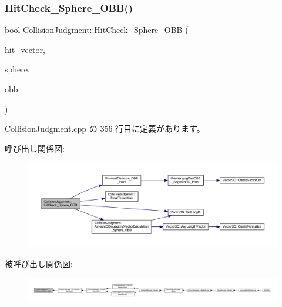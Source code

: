 \subsubsection{\texorpdfstring{Hit\+Check\+\_\+\+Sphere\+\_\+\+O\+B\+B()}{HitCheck\_Sphere\_OBB()}}
{\footnotesize\ttfamily bool Collision\+Judgment\+::\+Hit\+Check\+\_\+\+Sphere\+\_\+\+O\+BB (\begin{DoxyParamCaption}\item[{\mbox{\hyperlink{class_vector3_d}{Vector3D}} $\ast$}]{hit\+\_\+vector,  }\item[{\mbox{\hyperlink{class_sphere}{Sphere}} $\ast$}]{sphere,  }\item[{\mbox{\hyperlink{class_o_b_b}{O\+BB}} $\ast$}]{obb }\end{DoxyParamCaption})\hspace{0.3cm}{\ttfamily [static]}}



 Collision\+Judgment.\+cpp の 356 行目に定義があります。

呼び出し関係図\+:\nopagebreak
\begin{figure}[H]
\begin{center}
\leavevmode
\includegraphics[width=350pt]{class_collision_judgment_acd1d157a361d756632c73f4406442ce2_cgraph}
\end{center}
\end{figure}
被呼び出し関係図\+:
\nopagebreak
\begin{figure}[H]
\begin{center}
\leavevmode
\includegraphics[width=350pt]{class_collision_judgment_acd1d157a361d756632c73f4406442ce2_icgraph}
\end{center}
\end{figure}
\mbox{\label{class_collision_judgment_a47628fb2aef868f75942f378f63478cc}} 
